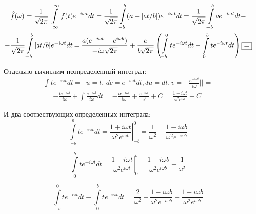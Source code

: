 \documentclass[a5paper, 10pt]{article}
\theoremstyle{definition}
\theoremstyle{plain}
\theoremstyle{remark}
\begin{document}
\begin{multline*}
\hat{f}(\omega) = \frac{1}{\sqrt{2 \pi}} \int \limits_{-\infty}^{\infty} f(t) e^{-i \omega t} dt =
 \frac{1}{\sqrt{2 \pi}} \int \limits_{-b}^{b} (a - |at / b|) e^{-i \omega t} dt =  \frac{1}{\sqrt{2 \pi}} \int \limits_{-b}^{b} a e^{-i \omega t} dt  -\\
- \frac{1}{\sqrt{2 \pi}} \int \limits_{-b}^{b}  |at / b| e^{-i \omega t} dt =   \frac{a ( e^{-i \omega b} -  e^{i \omega b})}{-i\omega \sqrt{2 \pi}} 
+ \frac{a}{b\sqrt{2 \pi}} \left( \int \limits_{-b}^{0}  t e^{-i \omega t} dt -  \int \limits_{0}^{b}  t e^{-i \omega t} dt  \right) \fbox{=}
\end{multline*}

Отдельно вычислим неопределенный интеграл:
\begin{multline}
\int  t e^{-i \omega t} dt = \left|  \right| u = t, \, dv =  e^{-i \omega t} dt, du=dt, v = -\frac{e^{-i \omega t}}{i \omega}\left|  \right| =\\
=  -\frac{t e^{-i \omega t}}{i \omega} + \int \frac{e^{-i \omega t}}{i \omega} dt =  -\frac{t e^{-i \omega t}}{i \omega} + \frac{e^{-i \omega t}}{ \omega^2} + C = \frac{1 + i \omega t}{\omega^2 e^{i \omega t}} + C
\end{multline} 

И два соотвествующих определенных интеграла:
\begin{equation}
\int \limits_{-b}^{0}  t e^{-i \omega t} dt =  \left. \frac{1 + i \omega t}{\omega^2 e^{i \omega t}} \right|^0_{-b} =  \frac{1}{\omega^2} -
 \frac{1 - i \omega b}{\omega^2 e^{-i \omega b}}
\end{equation}

\begin{equation}
\int \limits_{0}^{b}  t e^{-i \omega t} dt =  \left. \frac{1 + i \omega t}{\omega^2 e^{i \omega t}} \right|^b_{0} =
 \frac{1 + i \omega b}{\omega^2 e^{i \omega b}} -\frac{1}{\omega^2} 
\end{equation}

\begin{equation}
\int \limits_{-b}^{0}  t e^{-i \omega t} dt -  \int \limits_{0}^{b}  t e^{-i \omega t} dt  =  \frac{2}{\omega^2} -
 \frac{1 - i \omega b}{\omega^2 e^{-i \omega b}} - \frac{1 + i \omega b}{\omega^2 e^{i \omega b}} 
\end{equation}
\end{document}
